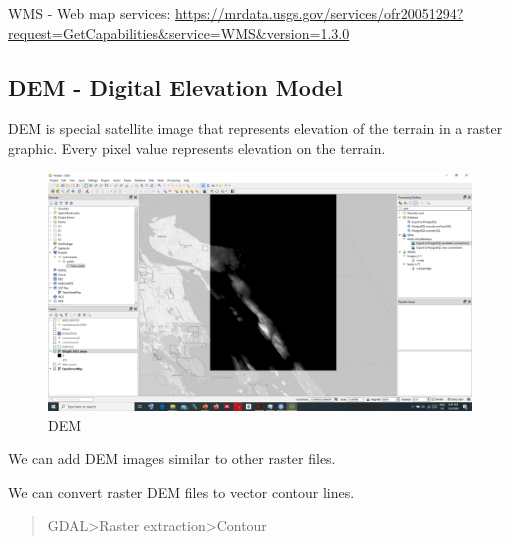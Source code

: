 \documentclass[
]{book}
\begin{document}
WMS - Web map services:
\url{https://mrdata.usgs.gov/services/ofr20051294?request=GetCapabilities\&service=WMS\&version=1.3.0}

\hypertarget{dem---digital-elevation-model}{%
\subsection{DEM - Digital Elevation Model}\label{dem---digital-elevation-model}}

DEM is special satellite image that represents elevation of the terrain in a raster graphic. Every pixel value represents elevation on the terrain.

\begin{figure}
\centering
\includegraphics{Images/DEM.png}
\caption{DEM}
\end{figure}

We can add DEM images similar to other raster files.

We can convert raster DEM files to vector contour lines.

\begin{quote}
GDAL\textgreater Raster extraction\textgreater Contour
\end{quote}
\end{document}
